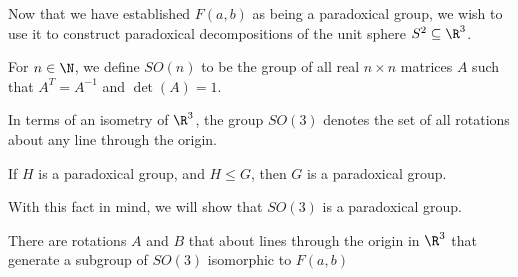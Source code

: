 Now that we have established $F(a,b)$ as being a paradoxical group, we wish to use it to construct paradoxical decompositions of the unit sphere $S^2 \subseteq \R^3$.
\begin{definition}
  For $n\in \N$, we define $SO(n)$ to be the group of all real $n\times n$ matrices $A$ such that $A^{T} = A^{-1}$ and $\det(A) = 1$.
\end{definition}
In terms of an isometry of $\R^3$, the group $SO(3)$ denotes the set of all rotations about any line through the origin.
\begin{fact}
  If $H$ is a paradoxical group, and $H\leq G$, then $G$ is a paradoxical group.
\end{fact}
With this fact in mind, we will show that $SO(3)$ is a paradoxical group.
\begin{theorem}
  There are rotations $A$ and $B$ that about lines through the origin in $\R^3$ that generate a subgroup of $SO(3)$ isomorphic to $F(a,b)$
\end{theorem}
